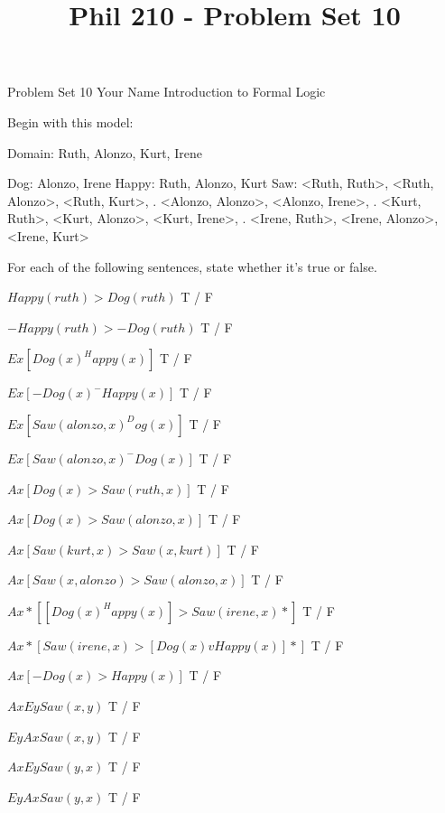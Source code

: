 
\title{Phil 210 - Problem Set 10}

\heading
Problem Set 10
Your Name
Introduction to Formal Logic
\endheading

Begin with this model:

\answer
	\firstordermodel 
	Domain: Ruth, Alonzo, Kurt, Irene

	Dog:    Alonzo, Irene
	Happy:  Ruth, Alonzo, Kurt
	Saw:    <Ruth, Ruth>, <Ruth, Alonzo>, <Ruth, Kurt>,
	   .    <Alonzo, Alonzo>, <Alonzo, Irene>,
	   .    <Kurt, Ruth>, <Kurt, Alonzo>, <Kurt, Irene>,
	   .    <Irene, Ruth>, <Irene, Alonzo>, <Irene, Kurt>
	\endfirstordermodel
\endanswer\bigskip

For each of the following sentences, state whether it's true or false.

\quantifiers
\problems
{}
$ Happy(ruth) > Dog(ruth) $
	\answer
	 T / F
	\endanswer

$ -Happy(ruth) > -Dog(ruth) $
	\answer
	 T / F
	\endanswer

$ Ex[Dog(x) ^ Happy(x)] $
	\answer
	 T / F
	\endanswer

$ Ex[-Dog(x) ^ -Happy(x)] $
	\answer
	 T / F
	\endanswer

$ Ex[Saw(alonzo,x) ^ Dog(x)] $
	\answer
	 T / F
	\endanswer

$ Ex[Saw(alonzo,x) ^ -Dog(x)] $
	\answer
	 T / F
	\endanswer

$ Ax[Dog(x) > Saw(ruth,x)] $
	\answer
	 T / F
	\endanswer

$ Ax[Dog(x) > Saw(alonzo,x)] $
	\answer
	 T / F
	\endanswer

$ Ax[Saw(kurt,x) > Saw(x,kurt)] $
	\answer
	 T / F
	\endanswer

$ Ax[Saw(x,alonzo) > Saw(alonzo,x)] $
	\answer
	 T / F
	\endanswer

$ Ax*[[Dog(x) ^ Happy(x)] > Saw(irene,x)*] $
	\answer
	 T / F
	\endanswer

$ Ax*[Saw(irene,x) > [Dog(x) v Happy(x)]*] $
	\answer
	 T / F
	\endanswer

$ Ax[-Dog(x) > Happy(x)] $
	\answer
	 T / F
	\endanswer

$ Ax Ey Saw(x,y) $
	\answer
	 T / F
	\endanswer

$ Ey Ax Saw(x,y) $
	\answer
	 T / F
	\endanswer

$ Ax Ey Saw(y,x) $
	\answer
	 T / F
	\endanswer

$ Ey Ax Saw(y,x) $
	\answer
	 T / F
	\endanswer

\endproblems
